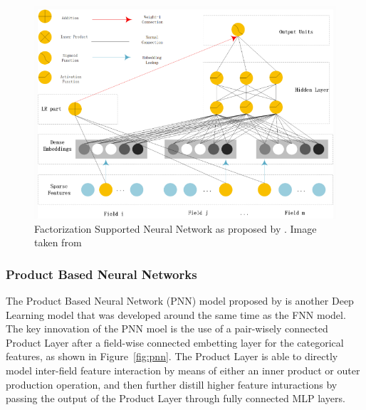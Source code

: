 \documentclass{mldsmsc}
\begin{document}
\begin{figure}[h]
\centering
\includegraphics[]{../figures/fnn.png}
\caption{Factorization Supported Neural Network as proposed by \cite{RefWorks:zhang2016deep}. Image taken from \cite{RefWorks:shen2017deepctr:}}
\label{fig:fnn}
\end{figure}

\subsubsection{Product Based Neural Networks}

The Product Based Neural Network (PNN) model
proposed by \cite{RefWorks:qu2016product-based} is another Deep Learning
model that was developed around the same time as the FNN model. The key 
innovation of the PNN moel is the use of a pair-wisely connected Product Layer
after a field-wise connected embetting layer for the categorical features, as shown
in Figure~\ref{fig:pnn}. The Product Layer is able to directly model inter-field feature
interaction by means of either an inner product or outer production operation, and then further
distill higher feature inturactions by passing the output of the Product Layer through fully
connected MLP layers.
\end{document}
